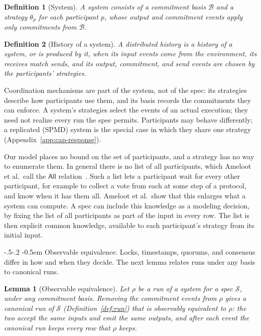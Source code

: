 \documentclass[sigconf]{cidr-2027}
\makeatletter
\newtheorem{lemma}{Lemma}
\newtheorem{definition}{Definition}
\theoremstyle{remark}
\renewcommand\paragraph{\@startsection{paragraph}{4}{\z@}%
  {-.5\baselineskip \@plus -2\p@ \@minus -.2\p@}%
  {-0.5em}%
  {\normalfont\bfseries}}
\newcommand{\commitment}{commitment\xspace}
\newcommand{\commitments}{commitments\xspace}
\newcommand{\Spec}{\mathcal{S}}
\makeatother
\begin{document}
\begin{definition}[System]
\label{def:system}
A \emph{system} consists of a \commitment basis $\mathcal B$ and a strategy
$\theta_p$ for each participant $p$, whose output and \commitment events apply
only \commitments from $\mathcal B$.
\end{definition}

\begin{definition}[History of a system]
\label{def:produced-history}
A distributed history is a \emph{history of} a system, or is \emph{produced} by
it, when its input events come from the environment, its receives match sends,
and its output, \commitment, and send events are chosen by the participants'
strategies.
\end{definition}

Coordination mechanisms are part of the system, not of the spec: its strategies
describe how participants use them, and its basis records the \commitments they
can enforce. A system's strategies select the events of an actual execution;
they need not realize every run the spec permits. Participants may behave
differently; a replicated (SPMD) system is the special case in which they share
one strategy (Appendix~\ref{app:cap-response}).

Our model places no bound on the set of participants, and a strategy has no way
to enumerate them. In general there is no list of all participants, which
Ameloot et al.\ call the $\mathsf{All}$ relation~\cite{ameloot2013relational}. Such a list lets a participant wait for every other participant, for example to
collect a vote from each at some step of a protocol, and know when it has them
all. Ameloot et al.\ show that this enlarges what a system can compute. A
spec can include this knowledge as a modeling decision, by fixing the list of
all participants as part of the input in every row. The list is then explicit
common knowledge, available to each participant's strategy from its initial
input.

\paragraph{Observable equivalence.}
Locks, timestamps, quorums, and consensus differ in how and when they decide. The next lemma relates runs under any basis to canonical runs.

\begin{lemma}[Observable equivalence]
\label{lem:canonical-equivalent}
\textcolor{reviewed}{Let $\rho$ be a run of a system for a spec $\Spec$, under any \commitment
basis.} \textcolor{reviewed}{Removing the \commitment events from $\rho$ gives a canonical run of
$\Spec$ (Definition~\ref{def:run}) that is \emph{observably equivalent} to
$\rho$: the two accept the same inputs and emit the same outputs, and after each
event the canonical run keeps every row that $\rho$ keeps.}
\end{lemma}
\end{document}
